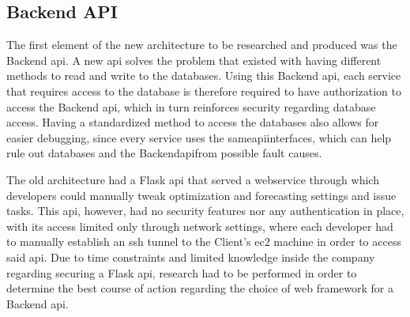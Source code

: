 


\subsection{Backend API}\label{methodology:ss:backendapi}
The first element of the new architecture to be researched and produced was the Backend \gls{api}. A new \gls{api} solves the problem that existed with having different methods to read and write to the databases. Using this Backend \gls{api}, each service that requires access to the database is therefore required to have authorization to access the Backend \gls{api}, which in turn reinforces security regarding database access. Having a standardized method to access the databases also allows for easier debugging, since every service uses the same\gls{api}interfaces, which can help rule out databases and the Backend\gls{api}from possible fault causes.

The old architecture had a Flask \gls{api} that served a webservice through which developers could manually tweak optimization and forecasting settings and issue tasks. This \gls{api}, however, had no security features nor any authentication in place, with its access limited only through network settings, where each developer had to manually establish an \gls{ssh} tunnel to the Client's \gls{ec2} machine in order to access said \gls{api}. Due to time constraints and limited knowledge inside the company regarding securing a Flask \gls{api}, research had to be performed in order to determine the best course of action regarding the choice of web framework for a Backend \gls{api}.

